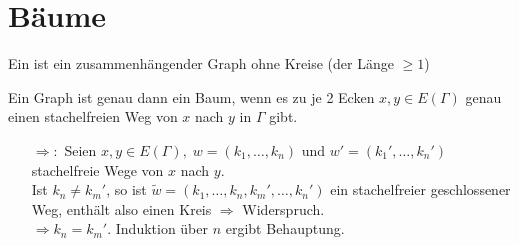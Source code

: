 \documentclass[a4paper, 10pt]{report}
\begin{document}
\section{Bäume}

\begin{Def}
Ein  ist ein zusammenhängender Graph ohne Kreise (der Länge $\ge 1$)
\end{Def}

\begin{Prop}
Ein Graph ist genau dann ein Baum, wenn es zu je 2 Ecken $x,y \in E(\Gamma)$
genau einen stachelfreien Weg von $x$ nach $y$ in $\Gamma$ gibt.
\end{Prop}
\begin{Bew}
\begin{itemize}
  \item[$\Rightarrow:$] Seien $x,y \in E(\Gamma), \; w = (k_1, \ldots, k_n)
  \textrm{ und } w' = (k_1', \ldots, k_n')$ stachelfreie Wege von $x$ nach $y$.\\
  Ist $k_n \not= k_m'$, so ist $\tilde{w} = (k_1, \ldots, k_n, k_m', \ldots,
  k_n')$ ein stachelfreier geschlossener Weg, enthält also einen Kreis
  $\Rightarrow$ Widerspruch.\\
  

  $\Rightarrow k_n = k_m'$. Induktion über $n$ ergibt Behauptung.
\end{itemize}

\end{Bew}

\end{document}
